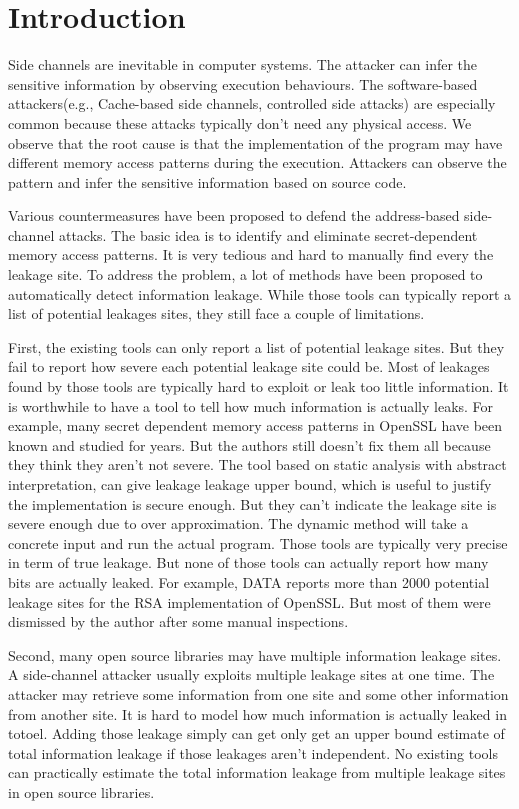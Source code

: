 \section{Introduction}

Side channels are inevitable in computer systems. The attacker can infer the sensitive 
information by observing execution behaviours. The software-based attackers(e.g., Cache-based 
side channels, controlled side attacks) are especially common because these attacks typically 
don’t need any physical access. We observe that the root cause is that the implementation of 
the program may have different memory access patterns during the execution. Attackers can 
observe the pattern and infer the sensitive information based on source code.

Various countermeasures have been proposed to defend the address-based side-channel attacks. 
The basic idea is to identify and eliminate secret-dependent memory access patterns. 
It is very tedious and hard to manually find every the leakage site. To address the problem, 
a lot of methods have been proposed to automatically detect information leakage. 
While those tools can typically report a list of potential leakages sites, they still 
face a couple of limitations.

First, the existing tools \cite{203878} can only report a list of potential leakage sites. But 
they fail to report how severe each potential leakage site could be. Most of leakages 
found by those tools are typically hard to exploit or leak too little information.  
It is worthwhile to have a tool to tell how much information is actually leaks. 
For example, many secret dependent memory access patterns in OpenSSL have been known 
and studied for years. But the authors still doesn’t fix them all because they think 
they aren’t not severe. The tool based on static analysis with abstract interpretation, 
can give leakage leakage upper bound, which is useful to justify the implementation is 
secure enough. But they can’t indicate the leakage site is severe enough due to over 
approximation. The dynamic method will take a concrete input and run the actual program. 
Those tools are typically very precise in term of true leakage. But none of those tools 
can actually report how many bits are actually leaked. For example, DATA reports more 
than 2000 potential leakage sites for the RSA implementation of OpenSSL. But most of 
them were dismissed by the author after some manual inspections.

Second, many open source libraries may have multiple information leakage sites. 
A side-channel attacker usually exploits multiple leakage sites at one time. The attacker
 may retrieve some information from one site and some other information from another site.
  It is hard to model how much information is actually leaked in totoel. Adding those leakage 
  simply can get only get an upper bound estimate of total information leakage if those 
  leakages aren’t independent. No existing tools can practically estimate the total information 
  leakage from multiple leakage sites in open source libraries.


